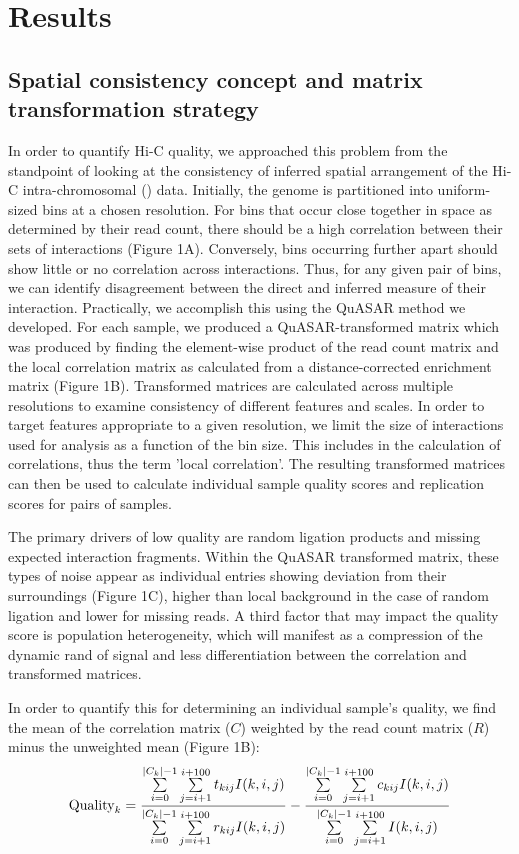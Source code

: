 \section{Results}
\subsection{Spatial consistency concept and matrix transformation strategy}

In order to quantify Hi-C quality, we approached this problem from the standpoint of looking at the consistency of inferred spatial arrangement of the Hi-C intra-chromosomal (\cis) data. Initially, the genome is partitioned into uniform-sized bins at a chosen resolution. For bins that occur close together in space as determined by their read count, there should be a high correlation between their sets of \cis interactions (Figure 1A). Conversely, bins occurring further apart should show little or no correlation across interactions. Thus, for any given pair of bins, we can identify disagreement between the direct and inferred measure of their interaction. Practically, we accomplish this using the QuASAR method we developed. For each sample, we produced a QuASAR-transformed matrix which was produced by finding the element-wise product of the read count matrix and the local correlation matrix as calculated from a distance-corrected enrichment matrix (Figure 1B). Transformed matrices are calculated across multiple resolutions to examine consistency of different features and scales. In order to target features appropriate to a given resolution, we limit the size of interactions used for analysis as a function of the bin size. This includes in the calculation of correlations, thus the term 'local correlation'. The resulting transformed matrices can then be used to calculate individual sample quality scores and replication scores for pairs of samples.

The primary drivers of low quality are random ligation products and missing expected interaction fragments. Within the QuASAR transformed matrix, these types of noise appear as individual entries showing deviation from their surroundings (Figure 1C), higher than local background in the case of random ligation and lower for missing reads. A third factor that may impact the quality score is population heterogeneity, which will manifest as a compression of the dynamic rand of signal and less differentiation between the correlation and transformed matrices.

In order to quantify this for determining an individual sample's quality, we find the mean of the correlation matrix ($C$) weighted by the read count matrix ($R$) minus the unweighted mean (Figure 1B):
\[\textnormal{Quality}_{k}=\frac{\sum\limits_{i=0}^{|C_k|-1}\sum\limits_{j=i+1}^{i+100}t_{kij}I(k,i,j)}{\sum\limits_{i=0}^{|C_k|-1}\sum\limits_{j=i+1}^{i+100}r_{kij}I(k,i,j)}-\frac{\sum\limits_{i=0}^{|C_k|-1}\sum\limits_{j=i+1}^{i+100}c_{kij}I(k,i,j)}{\sum\limits_{i=0}^{|C_k|-1}\sum\limits_{j=i+1}^{i+100}I(k,i,j)}\]

